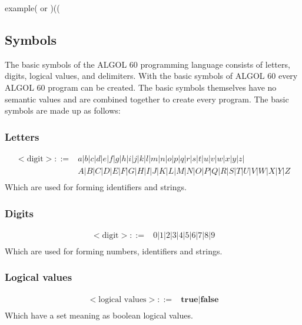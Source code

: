 \documentclass{article}
\begin{document}
example( or )((

\subsection{Symbols}
The basic symbols of the ALGOL 60 programming language consists of letters, digits, logical values, and delimiters. With the basic symbols of ALGOL 60 every ALGOL 60 program can be created. The basic symbols themselves have no semantic values and are combined together to create every program. The basic symbols are made up as follows: \\

\subsubsection{Letters}
\begin{equation} \label{eq2}
\begin{split}
<\text{digit}> ::=&a|b|c|d|e|f|g|h|i|j|k|l|m|n|o|p|q|r|s|t|u|v|w|x|y|z|\\&A|B|C|D|E|F|G|H|I|J|K|L|M|N|O|P|Q|R|S|T|U|V|W|X|Y|Z \\
\end{split}
\end{equation}
Which are used for forming identifiers and strings.

\subsubsection{Digits}
\begin{equation} \label{eq3}
\begin{split}
<\text{digit}> ::=&0|1|2|3|4|5|6|7|8|9 \\
\end{split}
\end{equation}
Which are used for forming numbers, identifiers and strings.

\subsubsection{Logical values}
\begin{equation} \label{eq4}
\begin{split}
<\text{logical values}> ::=&\textbf{true}|\textbf{false} \\
\end{split}
\end{equation}
Which have a set meaning as boolean logical values.
\end{document}
